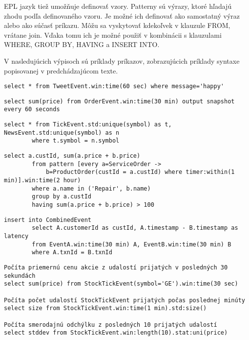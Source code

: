 		EPL jazyk tiež umožňuje definovať vzory. Patterny sú výrazy, ktoré hľadajú zhodu podľa definovaného vzoru. Je možné ich definovať ako samostatný výraz alebo ako súčasť príkazu. Môžu sa vyskytovať kdekoľvek v klauzule FROM, vrátane join. Vďaka tomu ich je možné použiť v kombinácii s klauzulami WHERE, GROUP BY, HAVING a INSERT INTO.
		
		V nasledujúcich výpisoch sú príklady príkazov, zobrazujúcich príklady syntaxe popisovanej v predchádzajúcom texte.
		\begin{lstlisting}[label=lst:epl-simple,caption=Jednoduchý EPL príkaz]
		select * from TweetEvent.win:time(60 sec) where message='happy'
		\end{lstlisting}
		
		\begin{lstlisting}[label=lst:output-example,caption=EPL príkaz s výstupom každých 60 sekúnd]
		select sum(price) from OrderEvent.win:time(30 min) output snapshot every 60 seconds
		\end{lstlisting}

		\begin{lstlisting}[label=lst:epl-join,caption=Jednoduchý EPL príkaz použitím join]
		select * from TickEvent.std:unique(symbol) as t, NewsEvent.std:unique(symbol) as n
		where t.symbol = n.symbol
		\end{lstlisting}

		\begin{lstlisting}[label=lst:epl-pattern,caption=EPL príkaz s použitím vzoru]
		select a.custId, sum(a.price + b.price)
		from pattern [every a=ServiceOrder -> 
			b=ProductOrder(custId = a.custId) where timer:within(1 min)].win:time(2 hour) 
		where a.name in ('Repair', b.name)
		group by a.custId
		having sum(a.price + b.price) > 100
		\end{lstlisting}
		
		\begin{lstlisting}[label=lst:insert-into,caption=Príklad použitia klauzuly INSERT INTO]
		insert into CombinedEvent
		select A.customerId as custId, A.timestamp - B.timestamp as latency
		from EventA.win:time(30 min) A, EventB.win:time(30 min) B
		where A.txnId = B.txnId
		\end{lstlisting}
		
		\begin{lstlisting}[label=lst:views,caption=Príklady použitia dátových náhľadov]
Počíta priemernú cenu akcie z udalostí prijatých v posledných 30 sekundách
select sum(price) from StockTickEvent(symbol='GE').win:time(30 sec)

Počíta počet udalostí StockTickEvent prijatých počas poslednej minúty
select size from StockTickEvent.win:time(1 min).std:size()

Počíta smerodajnú odchýlku z posledných 10 prijatých udalostí
select stddev from StockTickEvent.win:length(10).stat:uni(price)
		\end{lstlisting}
		
